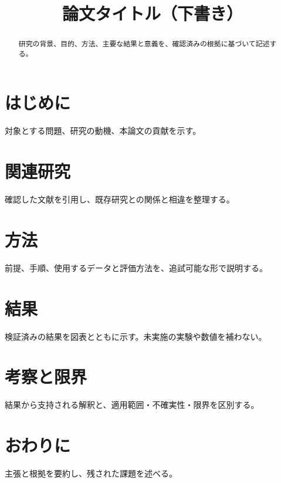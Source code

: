 \documentclass[a4paper,11pt]{ltjsarticle}
\title{論文タイトル（下書き）}
\author{}
\date{}
\begin{document}
\maketitle
\begin{abstract}
研究の背景、目的、方法、主要な結果と意義を、確認済みの根拠に基づいて記述する。
\end{abstract}
\section{はじめに}
対象とする問題、研究の動機、本論文の貢献を示す。
\section{関連研究}
確認した文献を引用し、既存研究との関係と相違を整理する。
\section{方法}
前提、手順、使用するデータと評価方法を、追試可能な形で説明する。
\section{結果}
検証済みの結果を図表とともに示す。未実施の実験や数値を補わない。
\section{考察と限界}
結果から支持される解釈と、適用範囲・不確実性・限界を区別する。
\section{おわりに}
主張と根拠を要約し、残された課題を述べる。
\end{document}
